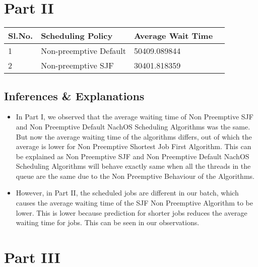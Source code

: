 \documentclass{article}
\begin{document}
\section{Part II}
\begin{center}
    \begin{tabular}{| l | l | l | l |}
    \hline
    Sl.No. & Scheduling Policy & Average Wait Time \\ \hline
    1 & Non-preemptive Default & 50409.089844 \\
    2 & Non-preemptive SJF & 30401.818359 \\
    \hline
    \end{tabular}
\end{center}
\subsection{Inferences \& Explanations}
\begin{itemize}
\item In Part I, we observed that the average waiting time of Non Preemptive SJF and Non Preemptive Default NachOS Scheduling Algorithms was the same. But now the average waiting time of the algorithms differs, out of which the average is lower for Non Preemptive Shortest Job First Algorithm. This can be explained as Non Preemptive SJF and Non Preemptive Default NachOS Scheduling Algorithms will behave exactly same when all the threads in the queue are the same due to the Non Preemptive Behaviour of the Algorithms.  
\item However, in Part II, the scheduled jobs are different in our batch, which causes the average waiting time of the  SJF Non Preemptive Algorithm to be lower. This is lower because prediction for shorter jobs reduces the average waiting time for jobs. This can be seen in our observations. 
\end{itemize}

\section{Part III}
\end{document}

